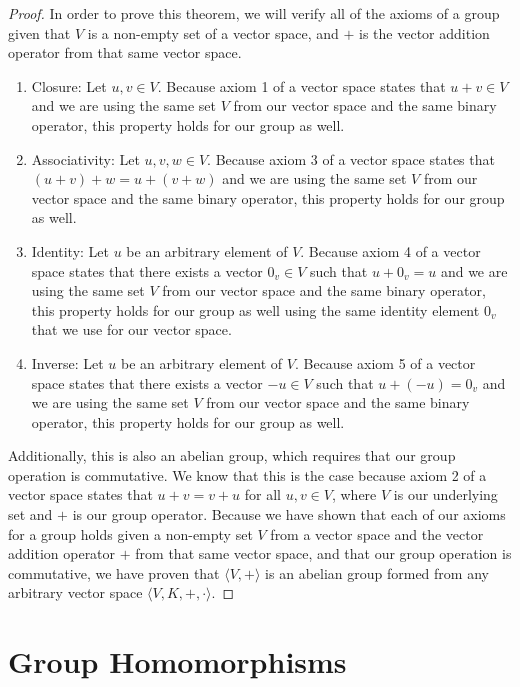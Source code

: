 \documentclass{article}
\newcommand{\done}{\renewcommand\qedsymbol{$\blacksquare$}}
\begin{document}
\begin{proof}
    In order to prove this theorem, we will verify all of the axioms of a group
    given that $V$ is a non-empty set of a vector space, and $+$ is the vector 
    addition operator from that same vector space. 
    \begin{enumerate}
      \item Closure: Let $u,v \in V$. Because axiom 1 of a vector space states that
      $u+v \in V$ and we are using the same set $V$ from our vector space and the 
      same binary operator, this property holds for our group as well.
      \item Associativity: Let $u,v,w \in V$. Because axiom 3 of a vector space states that
      $(u+v)+w = u+(v+w)$ and we are using the same set $V$ from our vector space and the
      same binary operator, this property holds for our group as well.
      \item Identity: Let $u$ be an arbitrary element of $V$. Because axiom 4 of a vector space states that
      there exists a vector $0_v \in V$ such that $u+0_v = u$ and we are using the same set $V$ from our vector space and the
      same binary operator, this property holds for our group as well using the 
      same identity element $0_v$ that we use for our vector space.
      \item Inverse: Let $u$ be an arbitrary element of $V$. Because axiom 5 of a vector space states that
      there exists a vector $-u \in V$ such that $u+(-u) = 0_v$ and we are using the same set $V$ from our vector space and the
      same binary operator, this property holds for our group as well.
    \end{enumerate}
Additionally, this is also an abelian group, which requires that our group operation 
is commutative. We know that this is the case because axiom 2 of a vector space states that
$u+v = v+u$ for all $u,v \in V$, where $V$ is our underlying set and $+$ is our group operator.
Because we have shown that each of our axioms for a group holds given a non-empty 
set $V$ from a vector space and the vector addition operator $+$ from that same
vector space, and that our group operation is commutative, we have proven that
$\langle V, + \rangle$ is an abelian group formed from any arbitrary vector space 
$\langle V, K, +, \cdot \rangle$.
\done  
\end{proof}

\section{Group Homomorphisms} 
\end{document}
